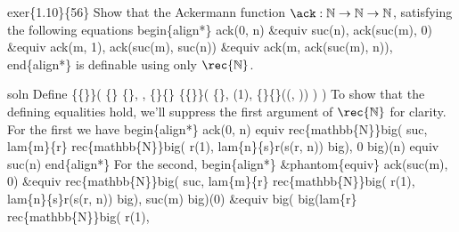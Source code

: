exer\{1.10\}\{56\}  Show that the Ackermann function $\ack : \mathbb{N} \to
\mathbb{N} \to \mathbb{N}$,
satisfying the following equations
begin\{align*\}
  ack(0, n) \&equiv suc(n), 
  ack(suc(m), 0) \&equiv ack(m, 1), 
  ack(suc(m), suc(n)) \&equiv ack(m, ack(suc(m), n)),
end\{align*\}
is definable using only $\rec{\mathbb{N}}$.


soln Define
    
  \{\{\}\}(
    \{\}  \{\}, 
    ,
    \{\}\{\}
      \{\{\}\}(
        \{\},
        (1),
        \{\}\{\}((, ))
      )
  )
To show that the defining equalities hold, we'll suppress the first argument of
$\rec{\mathbb{N}}$ for clarity.  For the first we have
begin\{align*\}
  ack(0, n)
  equiv
  rec\{mathbb\{N\}\}big(
    suc,
    lam\{m\}\{r\}
      rec\{mathbb\{N\}\}big(
        r(1),
        lam\{n\}\{s\}r(s(r, n))
      big),
    0
  big)(n)
  equiv
  suc(n)
end\{align*\}
For the second,
begin\{align*\}
  \&phantom\{equiv\} ack(suc(m), 0)
  \&equiv
  rec\{mathbb\{N\}\}big(
    suc,
    lam\{m\}\{r\}
      rec\{mathbb\{N\}\}big(
        r(1),
        lam\{n\}\{s\}r(s(r, n))
      big),
    suc(m)
  big)(0)
  \&equiv
  big(
  big(lam\{r\}
    rec\{mathbb\{N\}\}big(
      r(1),
